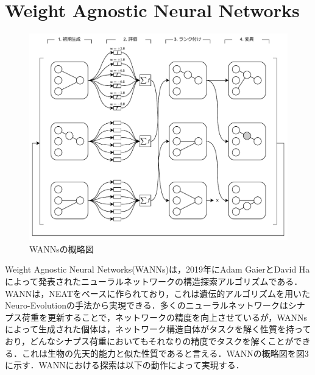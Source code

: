 \section{Weight Agnostic Neural Networks}

\begin{figure}[h]
    \begin{center}
        \includegraphics[scale=0.8]{img/expwann.pdf}
        \caption{WANNsの概略図}
    \end{center}
\end{figure}

Weight Agnostic Neural Networks(WANNs)は，2019年にAdam GaierとDavid Haによって発表されたニューラルネットワークの構造探索アルゴリズムである\cite{WANN}．WANNは，NEAT\cite{NEAT}をベースに作られており，これは遺伝的アルゴリズム\cite{遺伝的アルゴリズム}を用いたNeuro-Evolution\cite{NE}の手法から実現できる．多くのニューラルネットワークはシナプス荷重を更新することで，ネットワークの精度を向上させているが，WANNsによって生成された個体は，ネットワーク構造自体がタスクを解く性質を持っており，どんなシナプス荷重においてもそれなりの精度でタスクを解くことができる．これは生物の先天的能力と似た性質であると言える\cite{先天的能力}．WANNの概略図を図3に示す．WANNにおける探索は以下の動作によって実現する．

